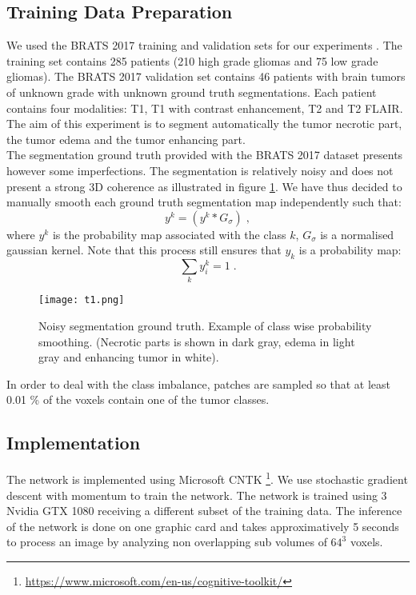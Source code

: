 \documentclass[11pt]{article}
\begin{document}
\subsection{Training Data Preparation}

We used the BRATS 2017 training and validation sets for our experiments \cite{brats1,brats2,brats3,brats4}. The training set contains 285 patients (210 high grade gliomas and 75 low grade gliomas). The BRATS 2017 validation set contains 46 patients with brain tumors of unknown grade with unknown ground truth segmentations. Each patient contains four modalities: T1, T1 with contrast enhancement, T2 and T2 FLAIR. The aim of this experiment is to segment automatically the tumor necrotic part, the tumor edema and the tumor enhancing part.\\

The segmentation ground truth provided with the BRATS 2017 dataset presents however some imperfections. The segmentation is relatively noisy and does not present a strong 3D coherence as illustrated in figure \ref{noisy}. We have thus decided to manually smooth each ground truth segmentation map independently such that:
\begin{equation}
y^k = (y^k \ast G_\sigma) \; ,
\end{equation}
where $y^k $ is the probability map associated with the class $k$, $G_\sigma$ is a normalised gaussian kernel. Note that this process still ensures that $y_k$ is a probability map:
\begin{equation}
\sum_{k} y_i^k = 1 \; .
\end{equation}

\begin{figure}[h]
    \centering
    \texttt{[image: t1.png]}
    \caption{Noisy segmentation ground truth. Example of class wise probability smoothing. (Necrotic parts is shown in dark gray, edema in light gray and enhancing tumor in white). }
    \label{noisy}
\end{figure}

In order to deal with the class imbalance, patches are sampled so that at least 0.01 \% of the voxels contain one of the tumor classes.

\subsection{Implementation}

The network is implemented using Microsoft CNTK \footnote{\url{https://www.microsoft.com/en-us/cognitive-toolkit/}}. We use stochastic gradient descent with momentum to train the network. The network is trained using 3 Nvidia GTX 1080 receiving a different subset of the training data. The inference of the network is done on one graphic card and takes approximatively 5 seconds to process an image by analyzing non overlapping sub volumes of $64^3$ voxels.\\
\end{document}
